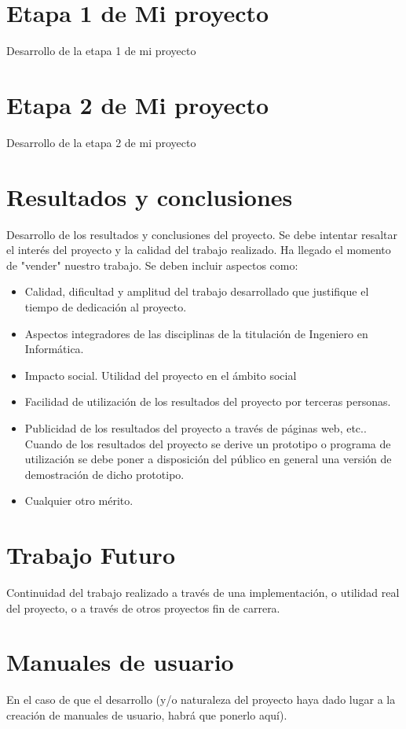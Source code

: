 \documentclass[12pt,a4paper,spanish]{book}
\begin{document}
\chapter{Etapa 1 de Mi proyecto}
 Desarrollo de la etapa 1 de mi proyecto
\chapter{Etapa 2 de Mi proyecto}
 Desarrollo de la etapa 2 de mi proyecto
\chapter{Resultados y conclusiones}
 Desarrollo de los resultados y conclusiones del proyecto. Se debe
intentar resaltar el interés del proyecto
 y la calidad del trabajo realizado. Ha llegado el momento de
"vender" nuestro trabajo. Se deben incluir aspectos como:
\begin{itemize}
\item Calidad, dificultad y amplitud del trabajo desarrollado que
justifique el tiempo de dedicación al proyecto.
\item Aspectos integradores de las disciplinas de la titulación de
Ingeniero en Informática.
\item Impacto social. Utilidad del proyecto en el ámbito social
\item Facilidad de utilización de los resultados del proyecto por
terceras personas.
\item Publicidad de los resultados del proyecto a través de páginas
web, etc.. Cuando de los resultados del proyecto
 se derive un prototipo o programa de utilización se debe poner
a disposición del público en general una versión
 de demostración de dicho prototipo.
\item Cualquier otro mérito.
\end{itemize}
\chapter{Trabajo Futuro}
 Continuidad del trabajo realizado a través de una implementación,
o utilidad real del proyecto,
 o a través de otros proyectos fin de carrera.
\appendix
\chapter{Manuales de usuario}
 En el caso de que el desarrollo (y/o naturaleza del proyecto haya
dado lugar a la creación de manuales
 de usuario, habrá que ponerlo aquí).
\end{document}
